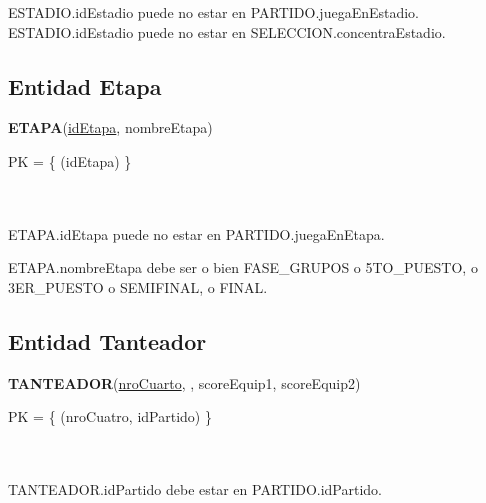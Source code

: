 \documentclass[11pt, a4paper, spanish]{article}
\begin{document}
{{{

ESTADIO.idEstadio puede no estar en PARTIDO.juegaEnEstadio. \\
ESTADIO.idEstadio puede no estar en SELECCION.concentraEstadio. \\



\subsection{Entidad Etapa}

\textbf{ETAPA}(\underline{idEtapa}, nombreEtapa)

PK = \{ (idEtapa) \} \\
 \\
 \\


ETAPA.idEtapa puede no estar en PARTIDO.juegaEnEtapa. \\


ETAPA.nombreEtapa debe ser o bien FASE\_GRUPOS o 5TO\_PUESTO, o 3ER\_PUESTO o SEMIFINAL, o FINAL. 

\newpage
\subsection{Entidad Tanteador}
\textbf{TANTEADOR}(\underline{nroCuarto}, \underline{}, scoreEquip1, scoreEquip2)

PK = \{ (nroCuatro, idPartido) \} \\
 \\
 \\


TANTEADOR.idPartido debe estar en PARTIDO.idPartido. \\

}}}
\end{document}
